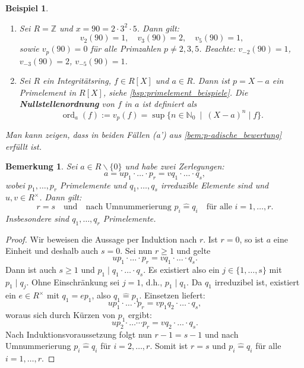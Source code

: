 \documentclass[a4paper, twoside, 11pt, ngerman]{report}
\newcommand{\NN}{\mathds N}
\newcommand{\ZZ}{\mathds Z}
\renewcommand{\setminus}{\smallsetminus}
\newcommand{\assoc}{\mathrel{\widehat{=}}}
\theoremstyle{definistyle}
\newtheorem{bem}[satz]{Bemerkung}
\newtheorem{bsp}[satz]{Beispiel}
\theoremstyle{remark}
\newcommand{\defn}[1]{\textit{\bfseries #1}}
\begin{document}
\begin{bsp}\label{bsp:diskrete_bewertung}
\begin{enumerate}[label=(\alph*)]
    \item Sei $R = \ZZ$ und $x = 90 = 2 \cdot 3^2 \cdot 5$. Dann gilt:
    \[
    v_2(90) = 1, \quad v_3(90) = 2, \quad v_5(90) = 1,
    \]
    sowie $v_p(90) = 0$ für alle Primzahlen $p \neq 2,3,5$. Beachte: $v_{-2}(90) = 1$, $v_{-3}(90) = 2$, $v_{-5}(90) = 1$.
    
    \item Sei $R$ ein Integritätsring, $f \in R[X]$ und $a \in R$. Dann ist $p = X - a$ ein Primelement in $R[X]$, siehe \ref{bsp:primelement_beispiele}. Die \defn{Nullstellenordnung} von $f$ in $a$ ist definiert als
    \[
    \operatorname{ord}_a(f) := v_p(f) = \sup \{n \in \NN_0 \ \mid \ (X - a)^n \mid f\}.
    \]
\end{enumerate}
Man kann zeigen, dass in beiden Fällen (a') aus \ref{bem:p-adische_bewertung} erfüllt ist.
\end{bsp}

\begin{bem}\label{bem:zerlegungen_eindeutigkeit}
Sei $a \in R \setminus \{0\}$ und habe zwei Zerlegungen:
\[
a = u p_1 \cdot\ldots\cdot p_r = v q_1 \cdot\ldots\cdot q_s,
\]
wobei $p_1, \dots, p_r$ Primelemente und $q_1, \dots, q_s$ irreduzible Elemente sind und $u, v \in R^\times$. Dann gilt:
\[
r = s \quad \text{und} \quad \text{nach Umnummerierung }p_i \assoc q_i \quad \text{für alle } i = 1, \dots, r.
\]
Insbesondere sind $q_1,\ldots,q_r$ Primelemente.
\end{bem}

\begin{proof}
Wir beweisen die Aussage per Induktion nach $r$.
Ist $r = 0$, so ist $a$ eine Einheit und deshalb auch $s=0$.
Sei nun $r \geq 1$ und gelte
\[
u p_1 \cdot\ldots\cdot p_r = v q_1 \cdot\ldots\cdot q_s.
\]
Dann ist auch $s \geq 1$ und $p_1 \mid q_1 \cdot\ldots\cdot q_s$. Es existiert also ein $j \in \{1, \dots, s\}$ mit $p_1 \mid q_j$. Ohne Einschränkung sei $j = 1$, d.h., $p_1 \mid q_1$. Da $q_1$ irreduzibel ist, existiert ein $e \in R^\times$ mit $q_1 = e p_1$, also $q_1 \assoc p_1$.
Einsetzen liefert:
\[
u p_1 \cdot\ldots\cdot p_r = v p_1 q_2 \cdot\ldots\cdot q_s,
\]
woraus sich durch Kürzen von $p_1$ ergibt:
\[
u p_2 \cdot\ldots\cdots p_r = v q_2 \cdot\ldots\cdot q_s.
\]
Nach Induktionsvoraussetzung folgt nun $r - 1 = s - 1$ und nach Umnummerierung  $p_i \assoc q_i$ für $i = 2, \dots, r$. Somit ist $r = s$ und $p_i \assoc q_i$ für alle $i = 1, \dots, r$.
\end{proof}
\end{document}
